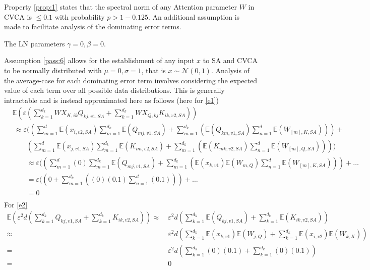Property \ref{prop:1} states that the spectral norm of any Attention parameter $W$ in CVCA is $\leq 0.1$ with probability $p > 1 - 0.125$. An additional assumption is made to facilitate analysis of the dominating error terms.
\begin{assumption}
    The LN parameters $\gamma = 0, \beta = 0$.
\label{pass:6}
\end{assumption}
Assumption \ref{pass:6} allows for the establishment of any input $x$ to SA and CVCA to be normally distributed with $\mu=0, \sigma=1$, that is $x \sim \mathcal{N}(0,1)$.
Analysis of the average-case for each dominating error term involves considering the expected value of each term over all possible data distributions. This is generally intractable and is instead approximated here as follows (here for \ref{e1})
\begin{equation}
\begin{aligned}
    & \mathbb{E} (\varepsilon (\sum_{k=1}^{d_k} WX_{K,ik} Q_{kj,v1,SA} + \sum_{k=1}^{d_k} WX_{Q,kj} K_{ik,v2,SA})) \\
    &\ \approx \varepsilon ((\sum_{m=1}^{d} \mathbb{E} (x_{i,v2,SA}) \sum_{m=1}^{d_k} \mathbb{E} (Q_{mj,v1,SA}) + \sum_{m=1}^{d_k} (\mathbb{E} (Q_{km,v1,SA}) \sum_{n=1}^{d} \mathbb{E} (W_{[m],K,SA}))) + \\
    &\qquad (\sum_{m=1}^{d} \mathbb{E} (x_{j,v1,SA}) \sum_{m=1}^{d_k} \mathbb{E} (K_{im,v2,SA}) + \sum_{m=1}^{d_k} (\mathbb{E} (K_{mk,v2,SA}) \sum_{n=1}^{d} \mathbb{E} (W_{[m],Q,SA})))) \\
    &\qquad \approx \varepsilon ((\sum_{m=1}^{d} (0) \sum_{m=1}^{d_k} \mathbb{E} (Q_{mj,v1,SA}) + \sum_{m=1}^{d_k} (\mathbb{E} (x_{k,v1}) \mathbb{E} (W_{m,Q}) \sum_{n=1}^{d} \mathbb{E} (W_{[m],K,SA}))) + \dots \\
    &\qquad = \varepsilon ((0 + \sum_{m=1}^{d_k} ((0) (0.1) \sum_{n=1}^{d} (0.1))) + \dots \\
    &\qquad = 0 \\
\end{aligned}
\end{equation}
For \ref{e2}
\begin{equation}
\begin{aligned}
    \mathbb{E} (\varepsilon^2 d (\sum_{k=1}^{d_k} Q_{kj,v1,SA} + \sum_{k=1}^{d_k} K_{ik,v2,SA})) \approx &\ \varepsilon^2 d (\sum_{k=1}^{d_k} \mathbb{E} (Q_{kj,v1,SA}) + \sum_{k=1}^{d_k} \mathbb{E} (K_{ik,v2,SA})) \\
    \approx &\ \varepsilon^2 d (\sum_{k=1}^{d_k} \mathbb{E} (x_{k,v1}) \mathbb{E} (W_{j,Q}) + \sum_{k=1}^{d_k} \mathbb{E} (x_{i,v2}) \mathbb{E} (W_{k,K})) \\
    = &\ \varepsilon^2 d (\sum_{k=1}^{d_k} (0) (0.1) + \sum_{k=1}^{d_k} (0) (0.1)) \\
    = &\ 0 \\
\end{aligned}
\end{equation}
